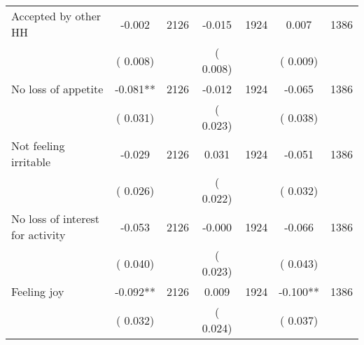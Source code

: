 \begin{tabular}{l*{6}{c}}
Accepted by other HH        &             -0.002      &       2126       &             -0.015      &       1924       &              0.007      &       1386       \\
                       &       (       0.008)            &                               &       (       0.008)            &                               &       (       0.009)            &                               \\
No loss of appetite        &             -0.081**      &       2126       &             -0.012      &       1924       &             -0.065      &       1386       \\
                       &       (       0.031)            &                               &       (       0.023)            &                               &       (       0.038)            &                               \\
Not feeling irritable        &             -0.029      &       2126       &              0.031      &       1924       &             -0.051      &       1386       \\
                       &       (       0.026)            &                               &       (       0.022)            &                               &       (       0.032)            &                               \\
No loss of interest for activity        &             -0.053      &       2126       &             -0.000      &       1924       &             -0.066      &       1386       \\
                       &       (       0.040)            &                               &       (       0.023)            &                               &       (       0.043)            &                               \\
Feeling joy        &             -0.092**      &       2126       &              0.009      &       1924       &             -0.100**      &       1386       \\
                       &       (       0.032)            &                               &       (       0.024)            &                               &       (       0.037)            &                               \\
\hline \end{tabular}